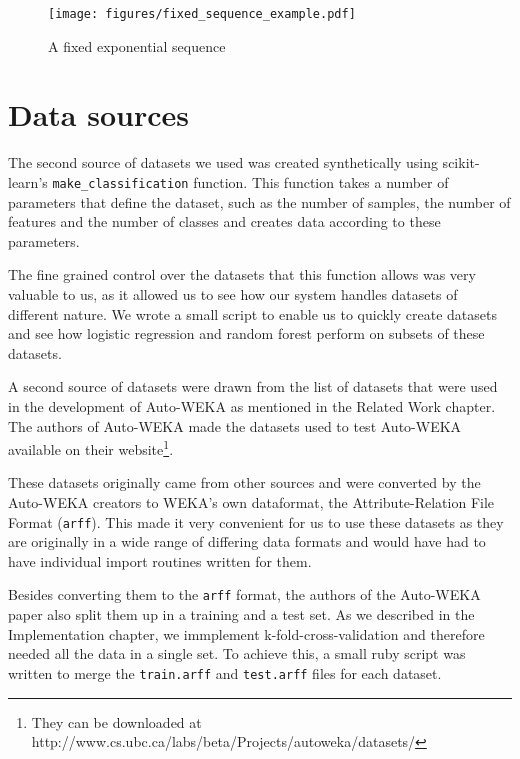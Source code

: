 \documentclass[a4paper,12pt,twoside,openright]{report}
\begin{document}

\begin{figure}
\centering
  \texttt{[image: figures/fixed\_sequence\_example.pdf]}
  \caption{A fixed exponential sequence}
  \label{fixedsequenceexample}
\end{figure}

\section{Data sources}
The second source of datasets we used was created synthetically using scikit-learn's \texttt{make\_classification} function. This function takes a number of parameters that define the dataset, such as the number of samples, the number of features and the number of classes and creates data according to these parameters. 

The fine grained control over the datasets that this function allows was very valuable to us, as it allowed us to see how our system handles datasets of different nature. We wrote a small script to enable us to quickly create datasets and see how logistic regression and random forest perform on subsets of these datasets.

A second source of datasets were drawn from the list of datasets that were used in the development of Auto-WEKA as mentioned in the Related Work chapter. The authors of Auto-WEKA made the datasets used to test Auto-WEKA available on their website\footnote{They can be downloaded at http://www.cs.ubc.ca/labs/beta/Projects/autoweka/datasets/}.

These datasets originally came from other sources \cite{Lichman:2013, Larochelle:2007:EED:1273496.1273556, Krizhevsky09learningmultiple} and were converted by the Auto-WEKA creators to WEKA's own dataformat, the Attribute-Relation File Format (\texttt{arff}). This made it very convenient for us to use these datasets as they are originally in a wide range of differing data formats and would have had to have individual import routines written for them. 

Besides converting them to the \texttt{arff} format, the authors of the Auto-WEKA paper also split them up in a training and a test set. As we described in the Implementation chapter, we immplement k-fold-cross-validation and therefore needed all the data in a single set. To achieve this, a small ruby script was written to merge the \texttt{train.arff} and \texttt{test.arff} files for each dataset.
\end{document}
